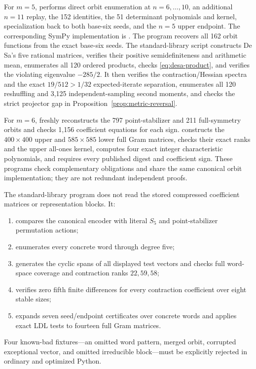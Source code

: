 \documentclass[11pt]{article}
\begin{document}
For \(m=5\),  performs direct orbit enumeration at \(n=6,\ldots,10\), an additional \(n=11\) replay, the 152 identities, the 51 determinant polynomials and kernel, specialization back to both base-six seeds, and the \(n=5\) upper endpoint.  The corresponding SymPy implementation is
.  The program
 recovers all 162 orbit functions from the exact base-six seeds.
The standard-library script
constructs De Sa's five rational matrices, verifies their positive semidefiniteness and arithmetic mean, enumerates all 120 ordered products, checks \eqref{eq:desa-product}, and verifies the violating eigenvalue \(-285/2\).
It then verifies the contraction/Hessian spectra and the exact
\(19/512>1/32\) expected-iterate separation, enumerates all 120 reshuffling
and 3,125 independent-sampling second moments, and checks the strict projector
gap in Proposition~\ref{prop:metric-reversal}.

For \(m=6\),
 freshly
reconstructs the 797 point-stabilizer and 211 full-symmetry orbits and checks
1,156 coefficient equations for each sign.
 constructs the
\(400\times400\) upper and \(585\times585\) lower full Gram matrices, checks
their exact ranks and the upper all-ones kernel, computes four exact integer
characteristic polynomials, and requires every published digest and
coefficient sign.  These programs check complementary obligations and share
the same canonical orbit implementation; they are not redundant independent
proofs.

The standard-library program
 does not read the stored compressed
coefficient matrices or representation blocks.  It:
\begin{enumerate}
\item compares the canonical encoder with literal \(S_5\) and point-stabilizer
permutation actions;
\item enumerates every concrete word through degree five;
\item generates the cyclic spans of all displayed test vectors and checks
full word-space coverage and contraction ranks \(22,59,58\);
\item verifies zero fifth finite differences for every contraction
coefficient over eight stable sizes;
\item expands seven seed/endpoint certificates over concrete words and applies
exact LDL tests to fourteen full Gram matrices.
\end{enumerate}
Four known-bad fixtures---an omitted word pattern, merged orbit, corrupted
exceptional vector, and omitted irreducible block---must be explicitly
rejected in ordinary and optimized Python.
\end{document}

